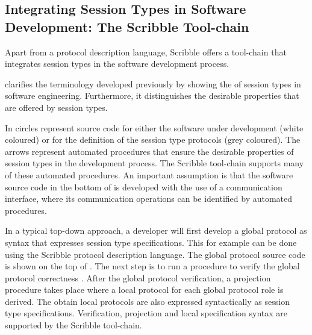 \subsection{Integrating Session Types in Software Development: The Scribble Tool-chain}
\label{sec:sessions_integrate}

Apart from a protocol description language,
Scribble offers a tool-chain that 
integrates session types in the software
development process.





 clarifies the terminology
developed previously by showing the
 of session types in software
engineering.
Furthermore, it distinguishes
the desirable properties that are offered by 
session types.

In  circles
represent source code for either the software
under development (white coloured) or for the definition
of the session type protocols (grey coloured). 
The arrows
represent automated procedures that ensure
the desirable properties of session types
in the development process. The Scribble
tool-chain supports many of these automated
procedures.
An important assumption
is that the software source code in the
bottom of  is developed
with the use of a communication interface,
where its communication operations
can be identified by automated procedures.


In a typical top-down approach, a developer will first develop a global protocol
as syntax that expresses session type specifications.
This for example can be done
using the Scribble protocol description language.
The global protocol source code is shown
on the top of .
The next step is to run a procedure to verify the 
global protocol correctness .
After the global protocol verification, a projection
procedure takes place where a local protocol
for each global protocol role is derived.
The obtain local protocols are also expressed
syntactically as session type specifications.
Verification, projection and local specification
syntax are supported by the Scribble tool-chain.

